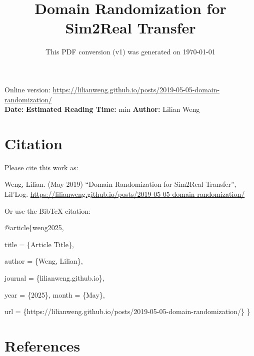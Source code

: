 \documentclass[12pt]{article}
\title{Domain Randomization for Sim2Real Transfer}
\date{This PDF conversion (v1) was generated on \today\footnotemark}
\begin{document}
\maketitle
\begin{center}
    Online version: \url{https://lilianweng.github.io/posts/2019-05-05-domain-randomization/} \\
    \textbf{Date:} \quad
    \textbf{Estimated Reading Time:}  min \quad
    \textbf{Author:} Lilian Weng
\end{center}




\newpage
\tableofcontents
\newpage
\vspace{1em}
\n\n\n\section{Citation}
Please cite this work as:

\begin{tcolorbox}[colback=black!5!white, colframe=black!80!white, boxrule=0.5pt, arc=2mm, left=1mm, right=1mm, top=1mm, bottom=1mm]
  Weng, Lilian. (May 2019) ``Domain Randomization for Sim2Real Transfer'', Lil'Log. \url{https://lilianweng.github.io/posts/2019-05-05-domain-randomization/}
  \end{tcolorbox}

Or use the BibTeX citation:

\begin{tcolorbox}[
    colback=black!5!white,
    colframe=black!80!white,
    boxrule=0.5pt,
    arc=2mm,
    left=1mm,
    right=1mm,
    top=1mm,
    bottom=1mm,
    listing only,
    listing options={
      basicstyle=\ttfamily\footnotesize,
      breaklines=true,
      literate={\{}{{\char`\{}}1 {\}}{{\char`\}}}1
    }
  ]
  @article\{weng2025,

    title   = \{Article Title\},

    author  = \{Weng, Lilian\},

    journal = \{lilianweng.github.io\},

    year    = \{2025\},
    month   = \{May\},

    url     = \{https://lilianweng.github.io/posts/2019-05-05-domain-randomization/\}\n
  \}
  \end{tcolorbox}

\newpage
\section{References}

\n
\end{document}

